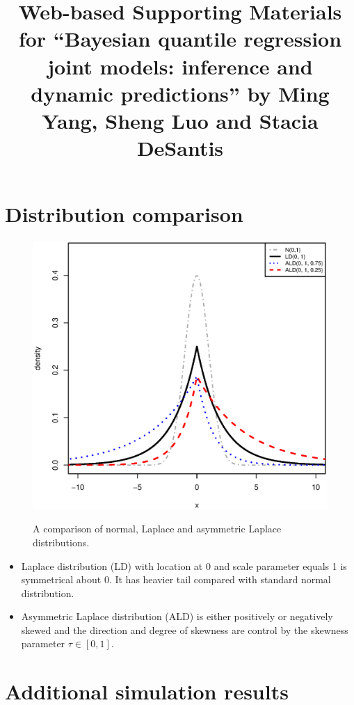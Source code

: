 \documentclass[12pt]{article}
\begin{document}
\title{Web-based Supporting Materials for ``Bayesian quantile regression joint models: inference and dynamic predictions'' by Ming Yang, Sheng Luo and Stacia DeSantis}

\date{}
\maketitle

\setlength{\baselineskip}{23pt}

\section{Distribution comparison}

\begin{figure}[H]
\centering
\includegraphics[width=0.4\columnwidth]{figures/ald_ld_normal.eps}\label{plot:ald_ld_normal}
\caption{A comparison of normal, Laplace and asymmetric Laplace distributions.}
\end{figure}

\begin{itemize}
\item Laplace distribution (LD) with location at 0 and scale parameter equals 1 is symmetrical about 0. It has heavier tail compared with standard normal distribution.
\item Asymmetric Laplace distribution (ALD) is either positively or negatively skewed and the direction and degree of skewness are control by the skewness parameter $\tau \in [0,1]$.
\end{itemize}


\newpage
\section{Additional simulation results}\label{sec:appendix_simulation}
\end{document}
